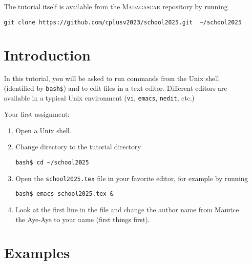 The tutorial itself is available from the \textsc{Madagascar} repository
by running
\begin{verbatim}
git clone https://github.com/cplusv2023/school2025.git  ~/school2025
\end{verbatim}

\section{Introduction}

In this tutorial, you will be asked to run commands from the Unix
shell (identified by \texttt{bash\$}) and to edit files in a text
editor. Different editors are available in a typical Unix environment
(\texttt{vi}, \texttt{emacs}, \texttt{nedit}, etc.)

Your first assignment:
\begin{enumerate}
\item Open a Unix shell.
\item Change directory to the tutorial directory
\begin{verbatim}
bash$ cd ~/school2025
\end{verbatim}
\item Open the \texttt{school2025.tex} file in your favorite editor,
  for example by running
\begin{verbatim}
bash$ emacs school2025.tex & 
\end{verbatim}
\item Look at the first line in the file and change the author name
  from Maurice the Aye-Aye to your name (first things first).
\end{enumerate}

\section{Examples}
